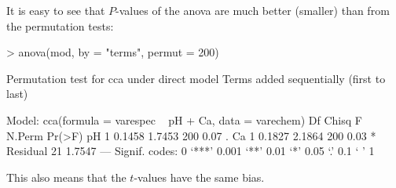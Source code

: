 \documentclass[a4paper]{article}
\begin{document}
It is easy to see that $P$-values of the anova are much better
(smaller) than from the permutation tests:
\begin{Schunk}
\begin{Sinput}
> anova(mod, by = "terms", permut = 200)
\end{Sinput}
\begin{Soutput}
Permutation test for cca under direct model
Terms added sequentially (first to last)

Model: cca(formula = varespec ~ pH + Ca, data = varechem)
         Df  Chisq      F N.Perm Pr(>F)  
pH        1 0.1458 1.7453    200   0.07 .
Ca        1 0.1827 2.1864    200   0.03 *
Residual 21 1.7547                       
---
Signif. codes:  0 ‘***’ 0.001 ‘**’ 0.01 ‘*’ 0.05 ‘.’ 0.1 ‘ ’ 1 
\end{Soutput}
\end{Schunk}
This also means that the $t$-values have the same bias.



\end{document}
